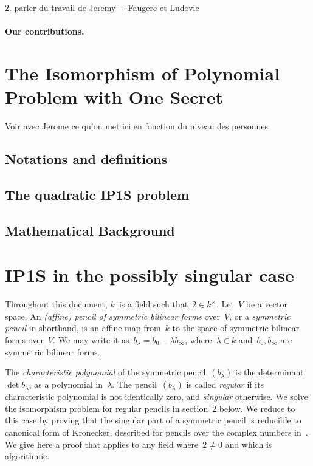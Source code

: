 \documentclass{lms}%
\begin{document}
2. parler du travail de Jeremy + Faugere et Ludovic

\paragraph{Our contributions.}

\section{The Isomorphism of Polynomial Problem with One Secret}
Voir avec Jerome ce qu'on met ici en fonction du niveau des personnes

\subsection{Notations and definitions}

\subsection{The quadratic IP1S problem}

\subsection{Mathematical Background}
\section{IP1S in the possibly singular case}%

Throughout this document, $k$~is a field such that~$2 ∈ k^{×}$. Let~$V$
be a vector space. An \emph{(affine) pencil of symmetric bilinear forms}
over~$V$, or a \emph{symmetric pencil} in shorthand, is an affine map
from~$k$ to the space of symmetric bilinear forms over~$V$. We may write
it as~$b_{λ} = b_{0} - λ b_{∞}$, where~$λ ∈ k$ and~$b_{0}, b_{∞}$ are
symmetric bilinear forms.

The \emph{characteristic polynomial} of the symmetric pencil~$(b_{λ})$ is
the determinant~$\det b_{λ}$, as a polynomial in~$λ$. The
pencil~$(b_{λ})$ is called \emph{regular} if its characteristic
polynomial is not identically zero, and \emph{singular} otherwise. We
solve the isomorphism problem for regular pencils in section 2 below. We
reduce to this case by proving that the singular part of a symmetric
pencil is reducible to canonical form of Kronecker, described for pencils
over the complex numbers in~\cite[XII(56)]{Gantmacher2}. We give here a
proof that applies to any field where~$2 ≠ 0$ and which is algorithmic.
\end{document}
